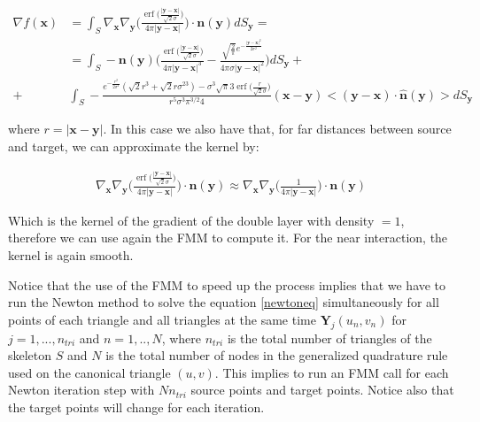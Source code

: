 \documentclass[11pt]{article}
\DeclareMathOperator\erf{erf}
\newcommand\bx{\boldsymbol x}
\newcommand\by{\boldsymbol y}
\newcommand\bn{\boldsymbol n}
\newcommand\bY{\boldsymbol Y}
\begin{document}
\begin{equation}\label{surf_nablaf}
\begin{aligned}
\nabla f(\bx)&=\int_{\mathit{S}}\nabla_{\bx}\nabla_{\by}\Big(\frac{\erf\big(\frac{|\by-\bx|}{\sqrt{2}\sigma}\big)}{4\pi|\by-\bx|}\Big)\cdot\bn(\by)dS_{\by}=\\
&=\int_{\mathit{S}}-\bn(\by)\Bigg(\frac{\erf\big(\frac{|\by-\bx|}{\sqrt{2}\sigma}\big)}{4\pi|\by-\bx|^3}-\frac{\sqrt{\frac{2}{\pi}}e^{-\frac{|\by-\bx|^2}{2\sigma^2}}}{4\pi\sigma|\by-\bx|^2}\Bigg)dS_{\by}+\\
+&\int_{\mathit{S}} -\frac{e^{-\frac{r^2}{2\sigma^2}}(\sqrt{2}r^3+\sqrt{2}r\sigma^23)-\sigma^3\sqrt{\pi}3\erf{\big(\frac{r}{\sqrt{2}\sigma}}\big)}{r^5\sigma^3\pi^{3/2}4}(\bx-\by)<(\by-\bx)\cdot \hat{\bn}(\by)>dS_{\by}
\end{aligned}
\end{equation}


where $r=|\bx-\by|$. In this case we also have that, for far distances between source and target, we can approximate the kernel by:

\begin{equation}
\begin{aligned}
\nabla_{\bx}\nabla_{\by}\Big(\frac{\erf\big(\frac{|\by-\bx|}{\sqrt{2}\sigma}\big)}{4\pi|\by-\bx|}\Big)\cdot\bn(\by)\approx
\nabla_{\bx}\nabla_{\by}\Big(\frac{1}{4\pi|\by-\bx|}\Big)\cdot\bn(\by)
\end{aligned}
\end{equation}

Which is the kernel of the gradient of the double layer with density $=1$, therefore we can use again the FMM to compute it. For the near interaction, the kernel is again smooth.

Notice that the use of the FMM to speed up the process implies that we have to run the Newton method to solve the equation \ref{newtoneq} simultaneously for all points of each triangle and all triangles at the same time $\bY_j(u_n,v_n)$ for $j=1,...,n_{tri}$ and $n=1,..,N$, where $n_{tri}$ is the total number of triangles of the skeleton $\mathit{S}$ and $N$ is the total number of nodes in the generalized quadrature rule used on the canonical triangle $(u,v)$. This implies to run an FMM call for each Newton iteration step with $Nn_{tri}$ source points and target points. Notice also that the target points will change for each iteration.
\end{document}
